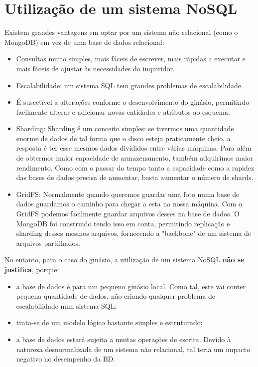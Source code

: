 \chapter{Utilização de um sistema NoSQL}

Existem grandes vantagens em optar por um sistema não relacional (como o MongoDB) em vez de uma base de dados relacional:

\begin{itemize}
    \item  Consultas muito simples, mais fáceis de escrever, mais rápidas a executar e mais fáceis de ajustar às necessidades do inquiridor.

    \item Escalabilidade: um sistema SQL tem grandes problemas de escalabilidade.

    \item É suscetível a alterações conforme o desenvolvimento do ginásio, permitindo facilmente alterar e adicionar novas entidades e atributos ao esquema.

    \item Sharding: Sharding é um conceito simples: se tivermos uma quantidade enorme de dados de tal forma que o disco esteja praticamente cheio, a resposta é ter esse mesmos dados divididos entre várias máquinas. Para além de obtermos maior capacidade de armazenamento, também adquirimos maior rendimento. Como com o passar do tempo tanto a capacidade como a rapidez das bases de dados precisa de aumentar, basta aumentar o número de shards.

    \item GridFS: Normalmente quando queremos guardar uma foto numa base de dados guardamos o caminho para chegar a esta na nossa máquina.
    Com o GridFS podemos facilmente guardar arquivos desses na base de dados. O MongoDB foi construido tendo isso em conta, permitindo replicação e sharding desses mesmos arquivos, fornecendo a "backbone" de um sistema de arquivos partilhados.

\end{itemize}

No entanto, para o caso do ginásio, a utilização de um sistema NoSQL \textbf{não se justifica}, porque:
\begin{itemize}
    \item a base de dados é para um pequeno ginásio local. Como tal, este vai conter pequena quantidade de dados, não criando qualquer problema de escalabilidade num sistema SQL;
    \item trata-se de um modelo lógico bastante simples e estruturado;
    \item a base de dados estará sujeita a muitas operações de escrita. Devido à natureza desnormalizada de um sistema não relacional, tal teria um impacto negativo no desempenho da BD.
\end{itemize}

